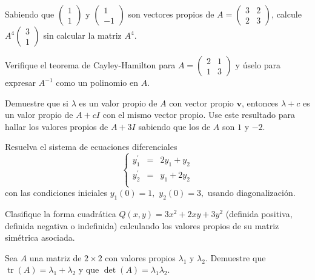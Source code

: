 \begin{prob}
Sabiendo que $\begin{pmatrix} 1 \\ 1 \end{pmatrix}$ y $\begin{pmatrix} 1 \\ -1 \end{pmatrix}$ son vectores propios de $A=\begin{pmatrix} 3 & 2 \\ 2 & 3 \end{pmatrix}$, calcule $A^{4}\begin{pmatrix} 3 \\ 1 \end{pmatrix}$ sin calcular la matriz $A^{4}$.
\end{prob}

\begin{prob}
Verifique el teorema de Cayley-Hamilton para $A=\begin{pmatrix} 2 & 1 \\ 1 & 3 \end{pmatrix}$ y úselo para expresar $A^{-1}$ como un polinomio en $A$.
\end{prob}

\begin{prob}
Demuestre que si $\lambda$ es un valor propio de $A$ con vector propio $\mathbf{v}$, entonces $\lambda+c$ es un valor propio de $A+cI$ con el mismo vector propio. Use este resultado para hallar los valores propios de $A+3I$ sabiendo que los de $A$ son $1$ y $-2$.
\end{prob}

\begin{prob}
Resuelva el sistema de ecuaciones diferenciales
\[
\left\lbrace \begin{matrix}
y_{1}^{\prime}&=&2y_1+y_2\\
y_{2}^{\prime}&=&y_1+2y_2\\
\end{matrix} \right.
\]
con las condiciones iniciales $y_{1}(0)=1,$ $y_{2}(0)=3,$ usando diagonalización.
\end{prob}

\begin{prob}
Clasifique la forma cuadrática $Q(x,y)=3x^{2}+2xy+3y^{2}$ (definida positiva, definida negativa o indefinida) calculando los valores propios de su matriz simétrica asociada.
\end{prob}

\begin{prob}
Sea $A$ una matriz de $2\times 2$ con valores propios $\lambda_1$ y $\lambda_2$. Demuestre que $\operatorname{tr}(A)=\lambda_1+\lambda_2$ y que $\det(A)=\lambda_1\lambda_2$.
\end{prob}

